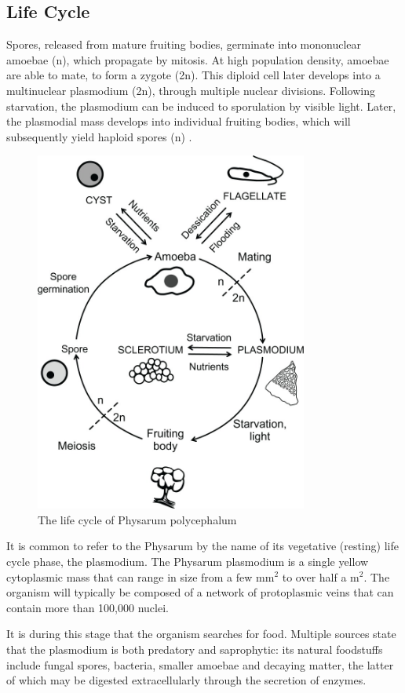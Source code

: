 \subsection{Life Cycle}
Spores, released from mature fruiting bodies, germinate into mononuclear amoebae (n), which propagate by mitosis. At high population density, amoebae are able to mate, to form a zygote (2n). This diploid cell later develops into a multinuclear plasmodium (2n), through multiple nuclear divisions. Following starvation, the plasmodium can be induced to sporulation by visible light. Later, the plasmodial mass develops into individual fruiting bodies, which will subsequently yield haploid spores (n) \cite{physlf}.

\begin{figure}
  \centering
    \includegraphics[width=0.8\textwidth]{physarum_life_cycle}%
    
  \caption{The life cycle of Physarum polycephalum\cite{physlf}}
  \label{fig:physarum_life_cycle}
\end{figure}

It is common to refer to the Physarum by the name of its vegetative (resting) life cycle phase, the plasmodium. The Physarum plasmodium is a single yellow cytoplasmic mass that can range in size from a few mm$^2$ to over half a m$^2$. The organism will typically be composed of a network of protoplasmic veins that can contain more than 100,000 nuclei.
\par
It is during this stage that the organism searches for food. Multiple sources state that the plasmodium is both predatory and saprophytic: its natural foodstuffs include fungal spores, bacteria, smaller amoebae and decaying matter, the latter of which may be digested extracellularly through the secretion of enzymes.

